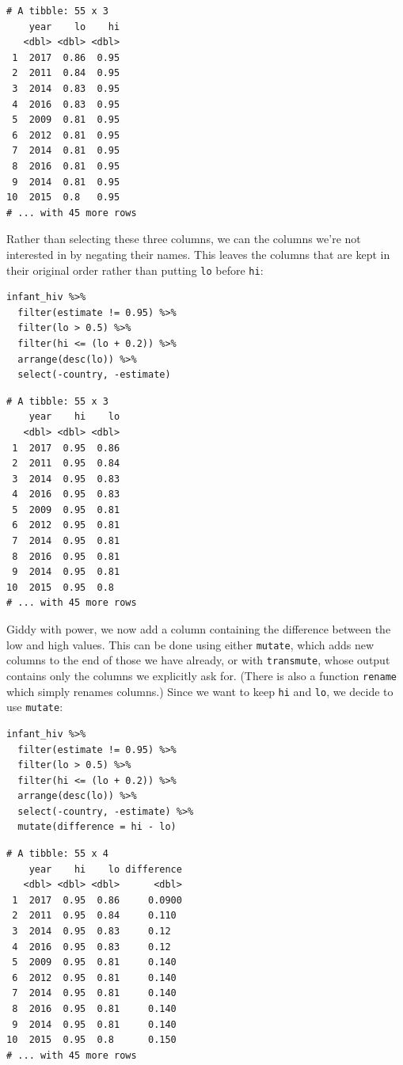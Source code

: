 \begin{lstlisting}
# A tibble: 55 x 3
    year    lo    hi
   <dbl> <dbl> <dbl>
 1  2017  0.86  0.95
 2  2011  0.84  0.95
 3  2014  0.83  0.95
 4  2016  0.83  0.95
 5  2009  0.81  0.95
 6  2012  0.81  0.95
 7  2014  0.81  0.95
 8  2016  0.81  0.95
 9  2014  0.81  0.95
10  2015  0.8   0.95
# ... with 45 more rows
\end{lstlisting}

Rather than selecting these three columns,
we can  the columns we're not interested in
by negating their names.
This leaves the columns that are kept in their original order
rather than putting \texttt{lo} before \texttt{hi}:

\begin{lstlisting}
infant_hiv %>%
  filter(estimate != 0.95) %>%
  filter(lo > 0.5) %>%
  filter(hi <= (lo + 0.2)) %>%
  arrange(desc(lo)) %>%
  select(-country, -estimate)
\end{lstlisting}

\begin{lstlisting}
# A tibble: 55 x 3
    year    hi    lo
   <dbl> <dbl> <dbl>
 1  2017  0.95  0.86
 2  2011  0.95  0.84
 3  2014  0.95  0.83
 4  2016  0.95  0.83
 5  2009  0.95  0.81
 6  2012  0.95  0.81
 7  2014  0.95  0.81
 8  2016  0.95  0.81
 9  2014  0.95  0.81
10  2015  0.95  0.8 
# ... with 45 more rows
\end{lstlisting}

Giddy with power,
we now add a column containing the difference between the low and high values.
This can be done using either \texttt{mutate},
which adds new columns to the end of those we have already,
or with \texttt{transmute},
whose output contains only the columns we explicitly ask for.
(There is also a function \texttt{rename} which simply renames columns.)
Since we want to keep \texttt{hi} and \texttt{lo},
we decide to use \texttt{mutate}:

\begin{lstlisting}
infant_hiv %>%
  filter(estimate != 0.95) %>%
  filter(lo > 0.5) %>%
  filter(hi <= (lo + 0.2)) %>%
  arrange(desc(lo)) %>%
  select(-country, -estimate) %>%
  mutate(difference = hi - lo)
\end{lstlisting}

\begin{lstlisting}
# A tibble: 55 x 4
    year    hi    lo difference
   <dbl> <dbl> <dbl>      <dbl>
 1  2017  0.95  0.86     0.0900
 2  2011  0.95  0.84     0.110 
 3  2014  0.95  0.83     0.12  
 4  2016  0.95  0.83     0.12  
 5  2009  0.95  0.81     0.140 
 6  2012  0.95  0.81     0.140 
 7  2014  0.95  0.81     0.140 
 8  2016  0.95  0.81     0.140 
 9  2014  0.95  0.81     0.140 
10  2015  0.95  0.8      0.150 
# ... with 45 more rows
\end{lstlisting}

